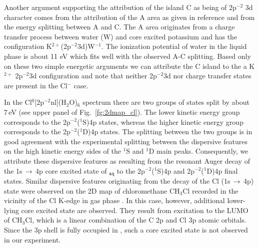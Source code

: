 Another argument supporting the attribution of the island C as being of 2p$^{-2}$ 3d character comes from the attribution of the A area as given in reference \cite{ceolin17:263003} and from the energy splitting between A and C. The A area originates from a charge transfer process between water (W) and core excited potassium and has the configuration K$^{2+}$(2p$^{-2}$3d)W$^{-1}$. The ionization potential of water in the liquid phase is about 11 eV which fits well with the observed A-C splitting. Based only on these two simple energetic arguments we can attribute the C island to the a K$^{2+}$ 2p$^{-2}$3d configuration and note that neither 2p$^{-2}$3d nor charge transfer states are present in the Cl$^{-}$ case.


In the Cl$^{0}$[2p$^{-2}$nl](H$_2$O)$_6$ spectrum there are two groups of states split by about 7\,eV (see upper panel of Fig.\ \ref{fg:2dmap_cl}). The lower kinetic energy group corresponds to the 2p$^{-2}$($^1$S)4p states, whereas the higher kinetic energy group corresponds to the 2p$^{-2}$($^1$D)4p states. The splitting between the two groups is in good agreement with the experimental splitting between the dispersive features on the high kinetic energy sides of the $^1$S and $^1$D main peaks. Consequently, we attribute these dispersive features as resulting from the resonant Auger decay of the 1s$\,\rightarrow\,$4p core excited state of \cli$_{\texttt{aq}}$ to the 2p$^{-2}$($^1$S)4p and  2p$^{-2}$($^1$D)4p final states. Similar dispersive features originating from the decay of the Cl (1s$\,\rightarrow\,$4p) state were observed on the 2D map of chloromethane CH$_3$Cl recorded in the vicinity of the Cl K-edge in gas phase \cite{gold16:133001}. In this case, however, additional lower-lying core excited state are observed. They result from excitation to the LUMO of CH$_3$Cl, which is a linear combination of the C 2p and Cl 3p atomic orbitals. Since the 3p shell is fully occupied in \cli, such a core excited state is not observed in our experiment.


